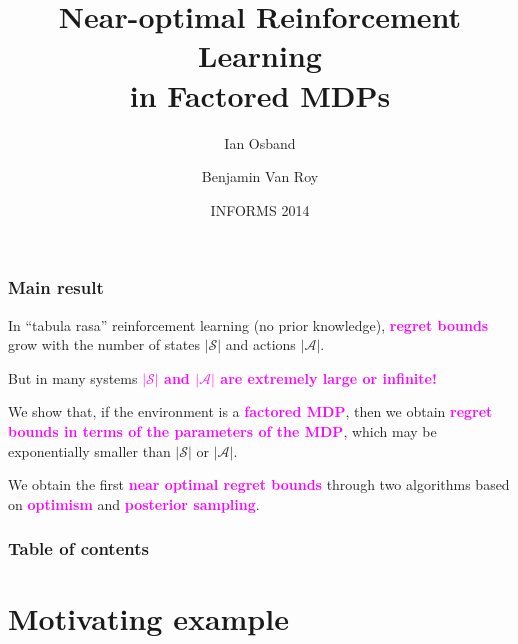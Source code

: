 \documentclass{beamer}
\title{Near-optimal Reinforcement Learning \\ in Factored MDPs}
\author{Ian Osband \and Benjamin Van Roy}
\institute{Mangement Science and Engineering \\
Stanford University \\
iosband@stanford.edu}
\date{INFORMS 2014}
\newcommand{\Sc}{\mathcal{S}}
\newcommand{\Ac}{\mathcal{A}}
\newcommand{\bspace}{\vspace{3mm}}
\newcommand{\hilite}[1]{\textcolor{magenta}{\textbf{#1}}}
\begin{document}
\maketitle

\begin{frame}
\frametitle{Main result}

In ``tabula rasa'' reinforcement learning (no prior knowledge), \hilite{regret bounds} grow with the number of states $|\Sc|$ and actions $|\Ac|$.

\bspace \bspace
But in many systems \hilite{$|\Sc|$ and $|\Ac|$ are extremely large or infinite!}

\bspace \bspace
We show that, if the environment is a \hilite{factored MDP}, then we obtain \hilite{regret bounds in terms of the parameters of the MDP}, which may be exponentially smaller than $|\Sc|$ or $|\Ac|$.

\bspace \bspace
We obtain the first \hilite{near optimal regret bounds} through two algorithms based on \hilite{optimism} and \hilite{posterior sampling}.

\end{frame}

\begin{frame}
\frametitle{Table of contents}
\tableofcontents
\end{frame}

\section{Motivating example}
\end{document}

